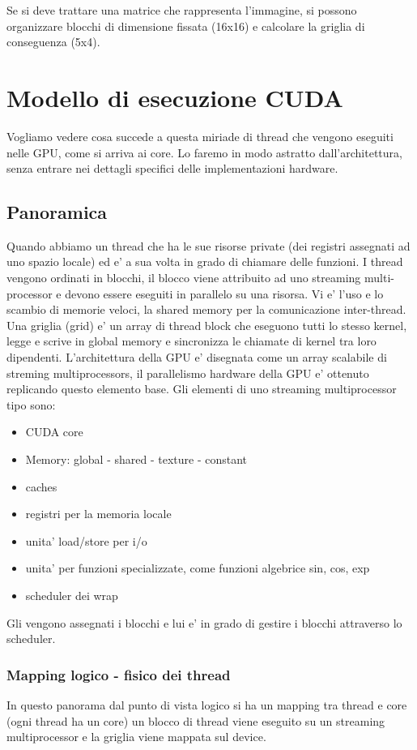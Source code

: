 Se si deve trattare una matrice che rappresenta l'immagine, si possono organizzare blocchi di dimensione fissata (16x16) e calcolare la griglia di conseguenza (5x4).

\section{Modello di esecuzione CUDA}
Vogliamo vedere cosa succede a questa miriade di thread che vengono eseguiti nelle GPU, come si arriva ai core. Lo faremo in modo astratto dall'architettura, senza entrare nei dettagli specifici delle implementazioni hardware.

\subsection{Panoramica}

Quando abbiamo un thread che ha le sue risorse private (dei registri assegnati ad uno spazio locale) ed e' a sua volta in grado di chiamare delle funzioni. I thread vengono ordinati in blocchi, il blocco viene attribuito ad uno streaming multi-processor e devono essere eseguiti in parallelo su una risorsa. Vi e' l'uso e lo scambio di memorie veloci, la shared memory per la comunicazione inter-thread. Una griglia (grid) e' un array di thread block che eseguono tutti lo stesso kernel, legge e scrive in global memory e sincronizza le chiamate di kernel tra loro dipendenti.
L'architettura della GPU e' disegnata come un array scalabile di streming multiprocessors, il parallelismo hardware della GPU e' ottenuto replicando questo elemento base.
Gli elementi di uno streaming multiprocessor tipo sono:
\begin{itemize}
    \item CUDA core
    \item Memory: global - shared - texture - constant
    \item caches
    \item registri per la memoria locale
    \item unita' load/store per i/o
    \item unita' per funzioni specializzate, come funzioni algebrice sin, cos, exp
    \item scheduler dei wrap
\end{itemize}
Gli vengono assegnati i blocchi e lui e' in grado di gestire i blocchi attraverso lo scheduler.

\subsubsection{Mapping logico - fisico dei thread}
In questo panorama dal punto di vista logico si ha un mapping tra thread e core (ogni thread ha un core) un blocco di thread viene eseguito su un streaming multiprocessor e la griglia viene mappata sul device.

